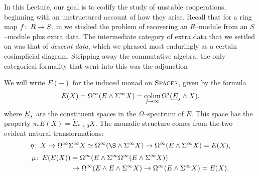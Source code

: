 In this Lecture, our goal is to codify the study of unstable cooperations, beginning with an unstructured account of how they arise.  Recall that for a ring map \(f\colon\thinspace R \to S\), in  we studied the problem of recovering an \(R\)--module from an \(S\)--module plus extra data.  The intermediate category of extra data that we settled on was that of \textit{descent data}, which we phrased most enduringly as a certain cosimplicial diagram.  Stripping away the commutative algebra, the only categorical formality that went into this was the adjunction
\begin{center}
\end{center}
We will write \(E(-)\) for the induced monad on \(\normalfont\textsc{Spaces}\), given by the formula \[E(X) = \Omega^\infty (E \wedge \Sigma^\infty X) = \operatorname*{colim}_{j \to \infty} \Omega^j (\underline{\smash{E}}_{j} \wedge X),\] where \(\underline{\smash{E}}_{*}\) are the constituent spaces in the \(\Omega\)--spectrum of \(E\).  This space has the property \(\pi_* E(X) = \widetilde E_{* \ge 0} X\).  The monadic structure comes from the two evident natural transformations:
\[\eta\co X \to \Loops^\infty \Susp^\infty X \simeq \Loops^\infty (\S \sm \Susp^\infty X) \to \Loops^\infty (E \sm \Susp^\infty X) = E(X),\] \vspace{-1.6\baselineskip}
\begin{align*}
\mu\colon\thinspace E(E(X)) & = \Omega^\infty(E \wedge \Sigma^\infty\Omega^\infty(E \wedge \Sigma^\infty X)) \\
& \to \Omega^\infty(E \wedge E \wedge \Sigma^\infty X) \to \Omega^\infty(E \wedge \Sigma^\infty X) = E(X).
\end{align*}

